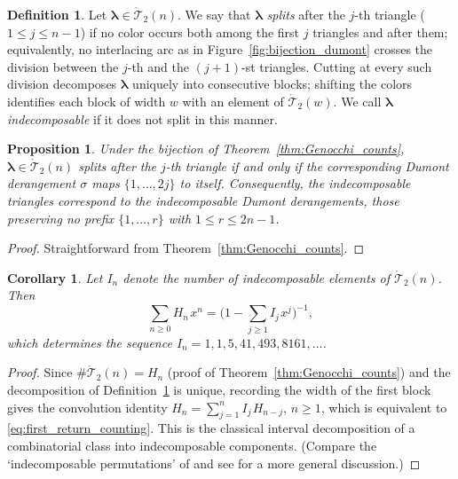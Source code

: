 \documentclass[10pt,a4paper]{amsart}
\numberwithin{equation}{section}
\newcommand{\ssp}{\hspace{1pt}}
\newtheorem{Corollary}[Theorem]{Corollary}
\newtheorem{Proposition}[Theorem]{Proposition}
\theoremstyle{definition}
\newtheorem{Definition}[Theorem]{Definition}
\begin{document}
\begin{Definition}
	\label{def:indecomposable_triangle}
	Let $\boldsymbol\lambda\in\mathring{\mathcal{T}}_2(n)$.
	We say that $\boldsymbol\lambda$ \emph{splits} after the $j$-th triangle
	($1\le j\le n-1$) if no color occurs both among the first $j$ triangles
	and after them; equivalently, no interlacing arc as in
	Figure~\ref{fig:bijection_dumont} crosses the division between the $j$-th and
	the $(j+1)$-st triangles.
	Cutting at every such division decomposes $\boldsymbol\lambda$ uniquely
	into consecutive blocks; shifting the colors identifies each block of
	width $w$ with an element of $\mathring{\mathcal{T}}_2(w)$.
	We call $\boldsymbol\lambda$ \emph{indecomposable} if it does not split
	in this manner.
\end{Definition}

\begin{Proposition}
	\label{prop:splits_direct_sum}
	Under the bijection of Theorem~{\rm \ref{thm:Genocchi_counts}},
	$\boldsymbol\lambda\in\mathring{\mathcal{T}}_2(n)$ splits after the
	$j$-th triangle if and only if the corresponding Dumont derangement
	$\sigma$ maps $\{1,\dots,2j\}$ to itself. Consequently, the indecomposable triangles correspond to the
	\emph{indecomposable} Dumont derangements, those preserving no
	prefix $\{1,\dots,r\}$ with $1\le r\le 2n-1$.
\end{Proposition}
\begin{proof}
	Straightforward from Theorem~\ref{thm:Genocchi_counts}.
\end{proof}

\begin{Corollary}
	\label{cor:indecomposable_count}
	Let $I_n$ denote the number of indecomposable elements of
	$\mathring{\mathcal{T}}_2(n)$.
	Then
	\begin{equation}
		\label{eq:first_return_counting}
		\sum_{n\ge0} H_n\ssp x^n=\biggl(1-\sum_{j\ge1} I_j\ssp
		x^j\biggr)^{-1},
	\end{equation}
	which determines the sequence $I_n=1,1,5,41,493,8161,\dots$.
\end{Corollary}
\begin{proof}
	Since $\#\mathring{\mathcal{T}}_2(n)=H_n$ (proof of
	Theorem~\ref{thm:Genocchi_counts}) and the decomposition of
	Definition~\ref{def:indecomposable_triangle} is unique, recording the width of the
	first block gives the convolution identity
	$H_n=\sum_{j=1}^{n} I_j\ssp H_{n-j}$, $n\ge1$, which is equivalent to
	\eqref{eq:first_return_counting}.
	This is the classical interval decomposition of a
	combinatorial class into indecomposable components. (Compare the
	`indecomposable permutations' of \cite{Comtet1972} and see
	\cite{Beissinger1985} for a more general discussion.)
\end{proof}
\end{document}
